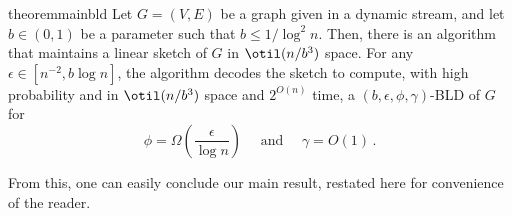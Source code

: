 \begin{restatable}{theorem}{mainbld}
	\label{th:main}
	Let $G=(V, E)$ be a graph given in a dynamic stream, and let $b \in (0,1)$ be a parameter such that $b \le 1/\log^2 n$. Then, there is an algorithm that maintains a linear sketch of $G$ in $\otil(n/b^3)$ space. For any $\epsilon \in [n^{-2}, b \log n]$, the algorithm decodes the sketch to compute, with high probability and in $\otil(n/b^3)$ space and $2^{O(n)}$ time, a $(b, \epsilon, \phi, \gamma)$-BLD of $G$ for
	\begin{equation*}
		\phi = \Omega\left(\frac{\epsilon}{\log n}\right) \quad \text{ and } \quad \gamma = O(1) \, .
	\end{equation*}
\end{restatable}
\noindent
From this, one can easily conclude our main result, restated here for convenience of the reader.

